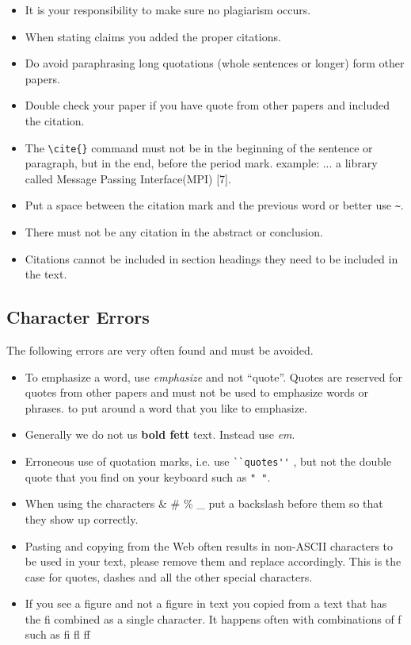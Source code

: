 \begin{itemize}[label=$\Box$]
   \item It is your responsibility to make sure no plagiarism occurs. 
   \item When stating claims you added the proper citations. 
   \item Do avoid paraphrasing long quotations (whole sentences or
     longer) form other papers.
   \item Double check your paper if you have quote from other papers
     and included the citation.
   \item The \verb|\cite{}| command must not be in the beginning of
     the sentence or paragraph, but in the end, before the period
     mark. example: ... a library called Message Passing
     Interface(MPI) [7]. 
   \item Put a space between the citation mark and the previous word
     or better use  \verb|~|.
   \item There must not be any citation in the abstract or conclusion.
   \item Citations cannot be included in section headings they need to be
     included in the text. 
\end{itemize}

\subsection{Character Errors}

The following errors are very often found and must be avoided.

\begin{itemize}[label=$\Box$]
    \item To emphasize a word, use {\em emphasize} and not
      ``quote''. Quotes are reserved for quotes from other papers and
      must not be used to emphasize words or phrases.
      to put around a word that you like to emphasize.
    \item Generally we do not us {\bf bold fett} text. Instead use
      {\em em}.
    \item Erroneous use of quotation marks, i.e. use \verb|``quotes''| ,
       but not the double quote that you find on your keyboard such as
       \verb|" "|.
    \item When using the characters \& \# \% \_ put a backslash before
      them so that they show up correctly.
    \item Pasting and copying from the Web often results in non-ASCII
      characters to be used in your text, please remove them and
      replace accordingly. This is the case for quotes, dashes and all
      the other special characters.
    \item If you see a f\hspace{-0.05cm}igure and not a figure in text
      you copied from a text that has the fi combined as a single
      character. It happens often with combinations of f such as fi fl
      ff
\end{itemize}

